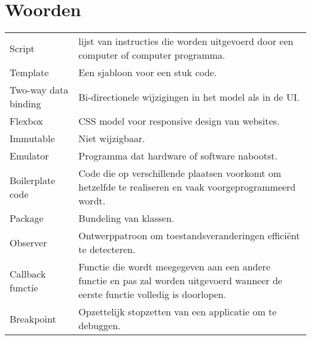 \section*{Woorden}
\begin{flushleft}
	\renewcommand{\arraystretch}{1.1}
	\begin{tabularx}{\textwidth}{@{}p{20mm}X@{}}
		Script\label{script} & lijst van instructies die worden uitgevoerd door een computer of computer programma.\\
		Template\label{template} & Een sjabloon voor een stuk code.\\
		Two-way data binding\label{twdb} & Bi-directionele wijzigingen in het model als in de UI.\\
Flexbox\label{flexbox} & CSS model voor responsive design van websites.\\
Immutable\label{immutable} & Niet wijzigbaar.\\
Emulator\label{emulator} & Programma dat hardware of software nabootst.\\
Boilerplate code\label{boilerplate} & Code die op verschillende plaatsen voorkomt om hetzelfde te realiseren en vaak voorgeprogrammeerd wordt.\\
Package\label{package} & Bundeling van klassen. \\
Observer\label{observer} & Ontwerppatroon om toestandsveranderingen efficiënt te detecteren.\\
Callback functie\label{callback} & Functie die wordt meegegeven aan een andere functie en pas zal worden uitgevoerd wanneer de eerste functie volledig is doorlopen.\\
Breakpoint\label{breakpoint} & Opzettelijk stopzetten van een applicatie om te debuggen. \\
 

	\end{tabularx}
\end{flushleft}